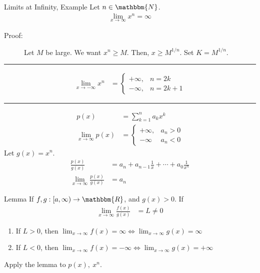 \documentclass[10pt]{extarticle}
\newcommand{\N}{\mathbbm{N}}
\newcommand{\R}{\mathbbm{R}}
\begin{document}
  \begin{problem}{Limits at Infinity, Example}
    Let $n\in \N$.
    \begin{align*}
      \lim_{x\rightarrow\infty}x^{n} = \infty
    \end{align*}
    \tcblower
    \begin{description}
      \item[Proof:] Let $M$ be large. We want $x^{n} \geq M$. Then, $x\geq M^{1/n}$. Set $K = M^{1/n}$.
    \end{description}
    \vspace{4pt}
    \rule{\textwidth}{0.4pt}
    \vspace{4pt}
    \begin{align*}
      \lim_{x\rightarrow -\infty}x^{n} &= \begin{cases}
        +\infty,&n = 2k\\
        -\infty,& n= 2k+1
      \end{cases}
    \end{align*}
    \vspace{4pt}
    \rule{\textwidth}{0.4pt}
    \vspace{4pt}
    \begin{align*}
      p(x) &= \sum_{k=1}^{n}a_kx^k\\
      \lim_{x\rightarrow\infty}p(x) &= \begin{cases}
        +\infty,&a_n > 0\\
        -\infty&a_n < 0
      \end{cases}
    \end{align*}
    Let $g(x) = x^n$.
    \begin{align*}
      \frac{p(x)}{g(x)} &= a_n + a_{n-1}\frac{1}{x} + \cdots + a_{0}\frac{1}{x^n}\\
      \lim_{x\rightarrow\infty}\frac{p(x)}{g(x)} &= a_n
    \end{align*}
    \begin{problem}{Lemma}
      If $f,g: [a,\infty)\rightarrow \R$, and $g(x) > 0$. If
      \begin{align*}
        \lim_{x\rightarrow \infty}\frac{f(x)}{g(x)} &= L \neq 0
      \end{align*}
      \begin{enumerate}[(1)]
        \item If $L > 0$, then $\lim_{x\rightarrow\infty} f(x) = \infty \Leftrightarrow \lim_{x\rightarrow\infty}g(x) = \infty$
        \item If $L < 0$, then $\lim_{x\rightarrow\infty} f(x)= -\infty \Leftrightarrow \lim_{x\rightarrow\infty}g(x) = +\infty$
      \end{enumerate}
    \end{problem}
    Apply the lemma to $p(x),~x^n$.
  \end{problem}
\end{document}
